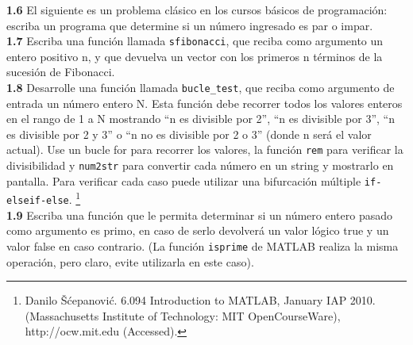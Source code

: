 \textbf{1.6} El siguiente es un problema clásico en los cursos básicos
de programación: escriba un programa que determine si un número
ingresado es par o impar. \\

\textbf{1.7} Escriba una función llamada \texttt{sfibonacci}, que reciba
como argumento un entero positivo n, y que devuelva un vector con los
primeros n términos de la sucesión de Fibonacci. \\

\textbf{1.8} Desarrolle una función llamada \texttt{bucle\_test}, que
reciba como argumento de entrada un número entero N. Esta función debe
recorrer todos los valores enteros en el rango de 1 a N mostrando ``n es
divisible por 2'', ``n es divisible por 3'', ``n es divisible por 2 y
3'' o ``n no es divisible por 2 o 3'' (donde n será el valor actual).
Use un bucle for para recorrer los valores, la función \texttt{rem} para
verificar la divisibilidad y \texttt{num2str} para convertir cada número
en un string y mostrarlo en pantalla. Para verificar cada caso puede
utilizar una bifurcación múltiple \texttt{if-elseif-else}. 
\footnote{Danilo
  Šćepanović. 6.094 Introduction to MATLAB, January IAP 2010.
  (Massachusetts Institute of Technology: MIT OpenCourseWare),
  http://ocw.mit.edu (Accessed).} \\

\textbf{1.9} Escriba una función que le permita determinar si un número
entero pasado como argumento es primo, en caso de serlo devolverá un
valor lógico true y un valor false en caso contrario. (La función
\texttt{isprime} de MATLAB realiza la misma operación, pero claro, evite utilizarla 
en este caso).
